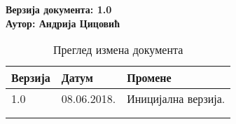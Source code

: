 \noindent
\textbf{Верзија документа: 1.0} \\
\textbf{Аутор: Андрија Цицовић}

\begin{table}[h!]
\centering
\small

    \begin{tabular}{ || m{} | m{} | m{} || }
    \hline
    \textbf{Верзија} & \textbf{Датум} & \textbf{Промене} \\
    \hline
    \hline
    1.0 & 08.06.2018. &
    Иницијална верзија. \\
    \hline
    & & \\
    \hline
    & & \\
    \hline
    \end{tabular}
    \caption{Преглед измена документа}
    \label{table:1}

\end{table}
\newpage
